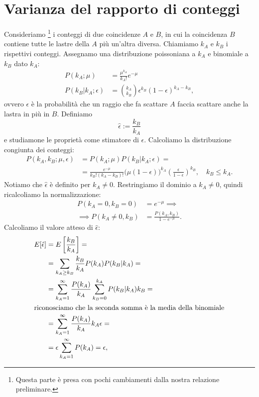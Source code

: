 \pagebreak

\appendix
\section{Varianza del rapporto di conteggi}
\label{sec:vareff}

Consideriamo%
\footnote{Questa parte è presa con pochi cambiamenti dalla nostra relazione preliminare.}
i conteggi di due coincidenze $A$ e $B$,
in cui la coincidenza $B$ contiene tutte le lastre della $A$ più un'altra diversa.
Chiamiamo $k_A$ e $k_B$ i rispettivi conteggi.
Assegnamo una distribuzione poissoniana a $k_A$ e binomiale a $k_B$ dato $k_A$:
\begin{align*}
	P(k_A;\mu)
	&= \frac{\mu^{k_A}}{k_A!}e^{-\mu} \\
	P(k_B|k_A;\epsilon)
	&= \binom{k_A}{k_B} \epsilon^{k_B} (1-\epsilon)^{k_A-k_B},
\end{align*}
ovvero $\epsilon$ è la probabilità che un raggio che fa scattare $A$
faccia scattare anche la lastra in più in $B$.
Definiamo
\begin{equation*}
	\hat\epsilon := \frac{k_B}{k_A}
\end{equation*}
e studiamone le proprietà come stimatore di $\epsilon$.
Calcoliamo la distribuzione congiunta dei conteggi:
\begin{align*}
	P(k_A,k_B;\mu,\epsilon)
	&= P(k_A;\mu) P(k_B|k_A;\epsilon) = \\
	&= \frac{e^{-\mu}}{k_B!(k_A-k_B)!} \big(\mu(1-\epsilon)\big)^{k_A} \left(\frac\epsilon{1-\epsilon}\right)^{k_B},
	\quad k_B \le k_A.
\end{align*}
Notiamo che $\hat\epsilon$ è definito per $k_A\neq 0$.
Restringiamo il dominio a $k_A\neq 0$,
quindi ricalcoliamo la normalizzazione:
\begin{align*}
	P(k_A=0,k_B=0)
	&= e^{-\mu} \implies \\
	\implies P(k_A\neq 0,k_B)
	&= \frac{P(k_A,k_B)}{1-e^{-\mu}}.
\end{align*}
Calcoliamo il valore atteso di $\hat\epsilon$:
\begin{align*}
	E[\hat\epsilon]
	&= E \left[ \frac{k_B}{k_A} \right] = \\
	&= \sum_{k_A\ge k_B} \frac{k_B}{k_A} P(k_A) P(k_B|k_A) = \\
	&= \sum_{k_A=1}^\infty \frac{P(k_A)}{k_A}
	\sum_{k_B=0}^{k_A} P(k_B|k_A) k_B = \\
	\intertext{riconosciamo che la seconda somma è la media della binomiale}
	&= \sum_{k_A=1}^\infty \frac{P(k_A)}{k_A} k_A \epsilon = \\
	&= \epsilon \sum_{k_A=1}^\infty P(k_A)
	= \epsilon,
\end{align*}
